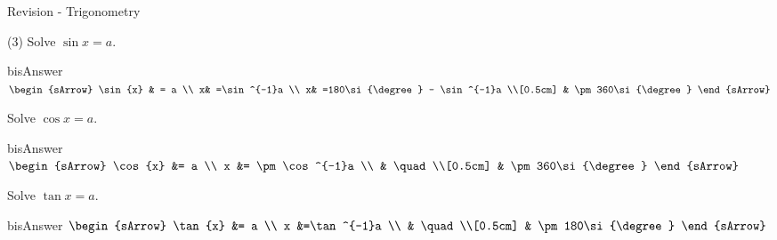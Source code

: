 \clearpage\noindent%
\begin{landscape}
\begin{bxTip}{\hypertarget{url09A}{Revision - Trigonometry}}    
\begin{tasksample}(3)
    \task[]  Solve $\sin{x}=a$.
              \begin{envOut}[equal height group=hRevF1]{bisAnswer}
			       $\begin{sArrow}
			              \sin{x} & = a                       \\        
                                  x& =\sin^{-1}a                     \\
						          x& =180\si{\degree} - \sin^{-1}a  	\\[0.5cm]
						 & \pm 360\si{\degree} 
	                \end{sArrow}$
              \end{envOut}
 
    \task[]  Solve $\cos{x}=a$.
              \begin{envOut}[equal height group=hRevF1]{bisAnswer}
			       $\begin{sArrow}
			               \cos{x} &= a                       \\        
                            x &= \pm \cos^{-1}a               \\
							& \quad \\[0.5cm] 
						 & \pm 360\si{\degree} 
	                \end{sArrow}$
              \end{envOut}
 
    \task[]  Solve $\tan{x}=a$.
              \begin{envOut}[equal height group=hRevF1]{bisAnswer}
			       $\begin{sArrow}
			              \tan{x} &= a                       \\        
                          x &=\tan^{-1}a                     \\
						 & \quad                             \\[0.5cm]
						 & \pm 180\si{\degree} 
	                \end{sArrow}$
              \end{envOut}
\end{tasksample}


\end{bxTip}
\end{landscape}
